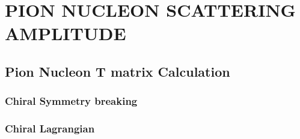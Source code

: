 \chapter{PION NUCLEON SCATTERING AMPLITUDE}

\section{Pion Nucleon T matrix Calculation}

\subsection{Chiral Symmetry breaking}
\subsection{Chiral Lagrangian}
